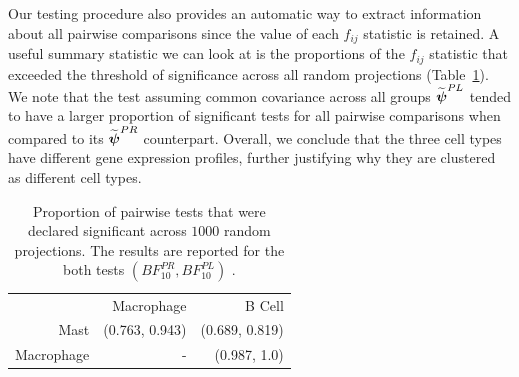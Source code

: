 \documentclass[times,sort&compress,3p]{elsarticle}
\theoremstyle{plain}%
\theoremstyle{definition}
\def\boldpsi{{\mbox{\boldmath $\psi$}}}
\begin{document}
Our testing procedure also provides an automatic way to extract information about all pairwise comparisons since the value of each $f_{ij}$ statistic is retained. A useful summary statistic we can look at is the proportions of the $f_{ij}$ statistic that exceeded the threshold of significance across all random projections (Table~\ref{tab:table7a}). We note that the test assuming common covariance across all groups $\widetilde{\boldpsi}^{PL}$ tended to have a larger proportion of significant tests for all pairwise comparisons when compared to its $\widetilde{\boldpsi}^{PR}$ counterpart. Overall, we conclude that the three cell types have different gene expression profiles, further justifying why they are clustered as different cell types.  

\begin{table}[ht]
\centering
\caption{Proportion of pairwise tests that were declared significant across $1000$ random projections. The results are reported for the both tests $(BF^{PR}_{10}, BF^{PL}_{10})$ .}
\label{tab:table7a}
\begin{tabular}{|rrr|}
  \hline
   & Macrophage & B Cell \\
    Mast & (0.763, 0.943)  & (0.689, 0.819) \\
    Macrophage & - & (0.987, 1.0)  \\
  \hline
\end{tabular}
\end{table}



\end{document}
